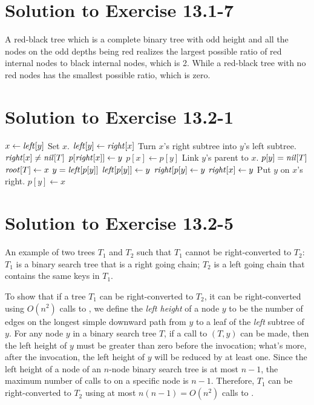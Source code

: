 \documentclass[a4paper, fleqn]{article}
\begin{document}
\section*{Solution to Exercise 13.1-7}

A red-black tree which is a complete binary tree with odd height and
all the nodes on the odd depths being red realizes the largest
possible ratio of red internal nodes to black internal nodes, which is
2. While a red-black tree with no red nodes has the smallest possible
ratio, which is zero.




\section*{Solution to Exercise 13.2-1}

\begin{codebox}
\li $x \gets \id{left}[y]$ \>\>\>\>\>\>\>  \Comment Set $x$.
\li $\id{left}[y] \gets \id{right}[x]$ \>\>\>\>\>\>\>
      \Comment Turn $x$'s right subtree into $y$'s left subtree.
\li \If $\id{right}[x] \neq \id{nil}[T]$
\li   \Then $p[\id{right}[x]] \gets y$
      \End
\li \If $p[x] \gets p[y]$ \>\>\>\>\>\>\>
      \Comment Link $y$'s parent to $x$.
\li \If $p[y] = \id{nil}[T]$
\li    \Then $\id{root}[T] \gets x$
\li    \Else \If $y = \id{left}[p[y]]$
\li        \Then $\id{left}[p[y]] \gets y$
\li        \Else $\id{right}[p[y] \gets y$
           \End
       \End
\li $\id{right}[x] \gets y$ \>\>\>\>\>\>\>
      \Comment Put $y$ on $x$'s right.
\li $p[y] \gets x$
\end{codebox}




\section*{Solution to Exercise 13.2-5}

An example of two trees $T_1$ and $T_2$ such that $T_1$ cannot be
right-converted to $T_2$: $T_1$ is a binary search tree that is a
right going chain; $T_2$ is a left going chain that contains the same
keys in $T_1$.

To show that if a tree $T_1$ can be right-converted to $T_2$, it can
be right-converted using $O(n^2)$ calls to , we
define the \emph{left height} of a node $y$ to be the number of edges
on the longest simple downward path from $y$ to a leaf of the
\emph{left} subtree of $y$. For any node $y$ in a binary search tree
$T$, if a call to $(T,y)$ can be made, then the
left height of $y$ must be greater than zero before the invocation;
what's more, after the invocation, the left height of $y$ will be
reduced by at least one. Since the left height of a node of an
$n$-node binary search tree is at most $n-1$, the maximum number of
calls to  on a specific node is $n-1$. Therefore,
$T_1$ can be right-converted to $T_2$ using at most $n(n-1) = O(n^2)$
calls to .
\end{document}
